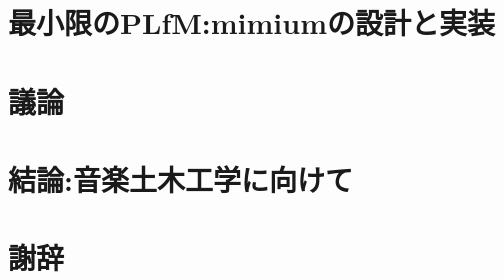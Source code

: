 \documentclass[luatex,unicode,titlepage,pdfusetitle,a4paper,openany]{ltjsbook}
\begin{document}
\chapter{最小限のPLfM:mimiumの設計と実装}


\chapter{議論}


\chapter{結論:音楽土木工学に向けて}


\printbibliography[title = 参考文献]

\chapter*{謝辞}

\end{document}
